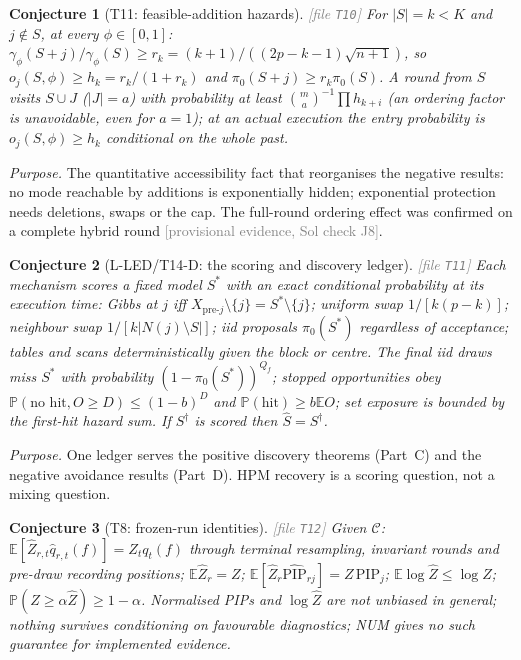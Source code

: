 \documentclass[11pt,a4paper]{article}
\theoremstyle{plain}
\newtheorem{conjecture}{Conjecture}[section]
\theoremstyle{definition}
\theoremstyle{remark}
\newcommand{\E}{\mathbb{E}}
\newcommand{\Prob}{\mathbb{P}}
\newcommand{\calC}{\mathcal{C}}
\newcommand{\Sdag}{S^{\dagger}}
\newcommand{\Shat}{\widehat S}
\newcommand{\PIP}{\mathrm{PIP}}
\newcommand{\PIPhat}{\widehat{\mathrm{PIP}}}
\newcommand{\Zhat}{\widehat Z}
\newcommand{\pizero}{\pi_0}
\newcommand{\Qf}{Q_{f}}
\newcommand{\provisional}[1]{\textcolor{gray}{[provisional evidence, Sol check #1]}}
\newcommand{\thfile}[1]{\textcolor{gray}{\footnotesize[file \texttt{#1}]}}
\begin{document}
\begin{conjecture}[T11: feasible-addition hazards]\thfile{T10}
For $|S|=k<K$ and $j\notin S$, at every $\phi\in[0,1]$: $\gamma_\phi(S+j)/\gamma_\phi(S)\ge r_k=(k+1)/((2p-k-1)\sqrt{n+1})$, so $o_j(S,\phi)\ge h_k=r_k/(1+r_k)$ and $\pizero(S+j)\ge r_k\pizero(S)$. A round from $S$ visits $S\cup J$ ($|J|=a$) with probability at least $\binom ma^{-1}\prod h_{k+i}$ (an ordering factor is unavoidable, even for $a=1$); at an actual execution the entry probability is $o_j(S,\phi)\ge h_k$ conditional on the whole past.
\end{conjecture}
\emph{Purpose.} The quantitative accessibility fact that reorganises the negative results: no mode reachable by additions is exponentially hidden; exponential protection needs deletions, swaps or the cap. The full-round ordering effect was confirmed on a complete hybrid round \provisional{J8}.

\begin{conjecture}[L-LED/T14-D: the scoring and discovery ledger]\thfile{T11}
Each mechanism scores a fixed model $S^*$ with an exact conditional probability at its execution time: Gibbs at $j$ iff $X_{\mathrm{pre}\text{-}j}\setminus\{j\}=S^*\setminus\{j\}$; uniform swap $1/[k(p-k)]$; neighbour swap $1/[k|N(j)\setminus S|]$; iid proposals $\pizero(S^*)$ regardless of acceptance; tables and scans deterministically given the block or centre. The final iid draws miss $S^*$ with probability $(1-\pizero(S^*))^{\Qf}$; stopped opportunities obey $\Prob(\text{no hit},O\ge D)\le(1-b)^D$ and $\Prob(\text{hit})\ge b\E O$; set exposure is bounded by the first-hit hazard sum. If $\Sdag$ is scored then $\Shat=\Sdag$.
\end{conjecture}
\emph{Purpose.} One ledger serves the positive discovery theorems (Part~C) and the negative avoidance results (Part~D). HPM recovery is a scoring question, not a mixing question.

\begin{conjecture}[T8: frozen-run identities]\thfile{T12}
Given $\calC$: $\E[\Zhat_{r,t}\widehat q_{r,t}(f)]=Z_tq_t(f)$ through terminal resampling, invariant rounds and pre-draw recording positions; $\E\Zhat_r=Z$; $\E[\Zhat_r\PIPhat_{rj}]=Z\,\PIP_j$; $\E\log\Zhat\le\log Z$; $\Prob(Z\ge\alpha\Zhat)\ge1-\alpha$. Normalised PIPs and $\log\Zhat$ are not unbiased in general; nothing survives conditioning on favourable diagnostics; NUM gives no such guarantee for implemented evidence.
\end{conjecture}
\end{document}
